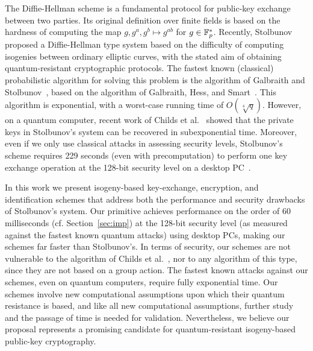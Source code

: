 The Diffie-Hellman scheme is a fundamental protocol for public-key
exchange between two parties. Its original definition over finite
fields is based on the hardness of computing the map $g,g^a,g^b
\mapsto g^{ab}$ for $g \in {\mathbb{F}}_p^*$. Recently, Stolbunov~\cite{Stol}
proposed a Diffie-Hellman type system based on the difficulty of
computing isogenies between ordinary elliptic curves, with the stated
aim of obtaining quantum-resistant cryptographic protocols.  The
fastest known (classical) probabilistic algorithm for solving this
problem is the algorithm of Galbraith and Stolbunov~\cite{galbraith+stolbunov11}, based
on the algorithm of Galbraith, Hess, and Smart~\cite{GHS}. This
algorithm is exponential, with a worst-case running time of
$O(\sqrt[4]{q})$. However, on a quantum computer, recent work of
Childs et al.~\cite{childs2014constructing} showed that the private keys in
Stolbunov's system can be recovered in subexponential time. Moreover,
even if we only use classical attacks in assessing security levels,
Stolbunov's scheme requires 229 seconds (even with precomputation) to
perform one key exchange operation at the 128-bit security level on a
desktop PC~\cite[Table 1]{Stol}.

In this work we present isogeny-based key-exchange, encryption, and
identification schemes that address both the performance and security
drawbacks of Stolbunov's system. Our primitive achieves performance on
the order of 60 milliseconds (cf. Section~\ref{sec:imp}) at the
128-bit security level (as measured against the fastest known quantum
attacks) using desktop PCs, making our schemes far faster than
Stolbunov's. In terms of security, our schemes are not vulnerable to
the algorithm of Childs et al.~\cite{childs2014constructing}, nor to any algorithm of
this type, since they are not based on a group action. The fastest
known attacks against our schemes, even on quantum computers, require
fully exponential time. Our schemes involve new computational
assumptions upon which their quantum resistance is based, and like all
new computational assumptions, further study and the passage of time
is needed for validation. Nevertheless, we believe our proposal
represents a promising candidate for quantum-resistant isogeny-based
public-key cryptography.

